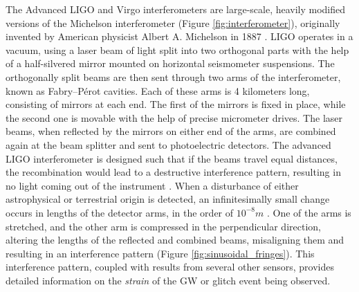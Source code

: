 \documentclass[12pt]{article}
\begin{document}
\medskip
\noindent The Advanced LIGO and Virgo interferometers are large-scale, heavily modified versions of the Michelson interferometer (Figure \ref{fig:interferometer}), originally invented by American physicist Albert A. Michelson in 1887 \cite{weiss_report_1972,collaboration_gwtc-3_2023}. LIGO operates in a vacuum, using a laser beam of light split into two orthogonal parts with the help of a half-silvered mirror mounted on horizontal seismometer suspensions. The orthogonally split beams are then sent through two arms of the interferometer, known as Fabry–Pérot cavities. Each of these arms is 4 kilometers long, consisting of mirrors at each end. The first of the mirrors is fixed in place, while the second one is movable with the help of precise micrometer drives. The laser beams, when reflected by the mirrors on either end of the arms, are combined again at the beam splitter and sent to photoelectric detectors. The advanced LIGO interferometer is designed such that if the beams travel equal distances, the recombination would lead to a destructive interference pattern, resulting in no light coming out of the instrument \cite{ligo_what_interferometer}. When a disturbance of either astrophysical or terrestrial origin is detected, an infinitesimally small change occurs in lengths of the detector arms, in the order of $10^{-8}m$ \cite{ghonge_assessing_2024}. One of the arms is stretched, and the other arm is compressed in the perpendicular direction, altering the lengths of the reflected and combined beams, misaligning them and resulting in an interference pattern (Figure \ref{fig:sinusoidal_fringes}). This interference pattern, coupled with results from several other sensors, provides detailed information on the \textit{strain} of the GW or glitch event being observed.
\end{document}
